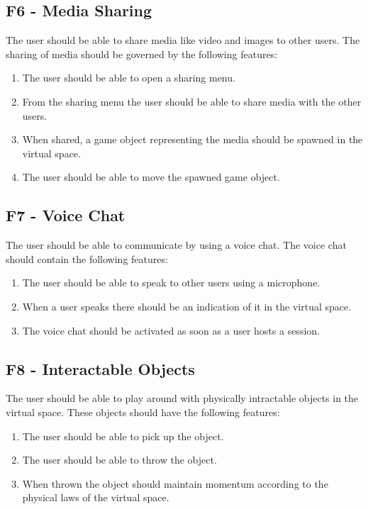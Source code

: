         \subsection{F6 - Media Sharing}
        The user should be able to share media like video and images to other users. The sharing of media should be governed by the following features:
        \begin{enumerate}
            \item The user should be able to open a sharing menu.
            \item From the sharing menu the user should be able to share media with the other users.
            \item When shared, a game object representing the media should be spawned in the virtual space.
            \item The user should be able to move the spawned game object.
        \end{enumerate}
        
        \subsection{F7 - Voice Chat}
        The user should be able to communicate by using a voice chat. The voice chat should contain the following features:
        \begin{enumerate}
            \item The user should be able to speak to other users using a microphone.
            \item When a user speaks there should be an indication of it in the virtual space.
            \item The voice chat should be activated as soon as a user hosts a session.
        \end{enumerate}
        
        \subsection{F8 - Interactable Objects}
        The user should be able to play around with physically intractable objects in the virtual space. These objects should have the following features:
        \begin{enumerate}
            \item The user should be able to pick up the object.
            \item The user should be able to throw the object.
            \item When thrown the object should maintain momentum according to the physical laws of the virtual space.
        \end{enumerate}
        
